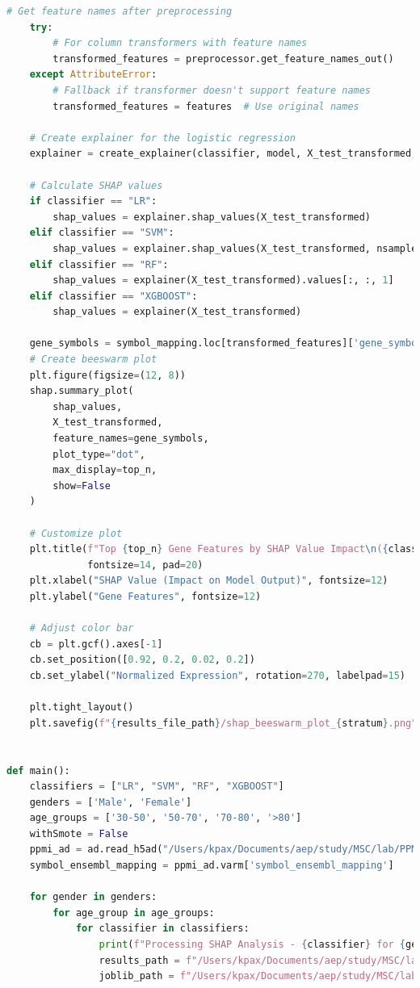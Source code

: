\documentclass[12pt]{report}
\begin{document}
\begin{lstlisting}[language=Python,caption={shap\_analysis\_stratified.py: Ανάλυση SHAP όλων των αποτελεσμάτων κατηγοριοποίησης από τους αλγορίθμους ML}, label=lst:shapanalysisstratified]
    # Get feature names after preprocessing
    try:
        # For column transformers with feature names
        transformed_features = preprocessor.get_feature_names_out()
    except AttributeError:
        # Fallback if transformer doesn't support feature names
        transformed_features = features  # Use original names

    # Create explainer for the logistic regression
    explainer = create_explainer(classifier, model, X_test_transformed, X_train_transformed)

    # Calculate SHAP values
    if classifier == "LR":
        shap_values = explainer.shap_values(X_test_transformed)
    elif classifier == "SVM":
        shap_values = explainer.shap_values(X_test_transformed, nsamples=100) # For class 1
    elif classifier == "RF":
        shap_values = explainer(X_test_transformed).values[:, :, 1]
    elif classifier == "XGBOOST":
        shap_values = explainer(X_test_transformed)

    gene_symbols = symbol_mapping.loc[transformed_features]['gene_symbol'].to_list()
    # Create beeswarm plot
    plt.figure(figsize=(12, 8))
    shap.summary_plot(
        shap_values,
        X_test_transformed,
        feature_names=gene_symbols,
        plot_type="dot",
        max_display=top_n,
        show=False
    )

    # Customize plot
    plt.title(f"Top {top_n} Gene Features by SHAP Value Impact\n({classifier} Pipeline)",
              fontsize=14, pad=20)
    plt.xlabel("SHAP Value (Impact on Model Output)", fontsize=12)
    plt.ylabel("Gene Features", fontsize=12)

    # Adjust color bar
    cb = plt.gcf().axes[-1]
    cb.set_position([0.92, 0.2, 0.02, 0.2])
    cb.set_ylabel("Normalized Expression", rotation=270, labelpad=15)

    plt.tight_layout()
    plt.savefig(f"{results_file_path}/shap_beeswarm_plot_{stratum}.png")


def main():
    classifiers = ["LR", "SVM", "RF", "XGBOOST"]
    genders = ['Male', 'Female']
    age_groups = ['30-50', '50-70', '70-80', '>80']
    withSmote = False
    ppmi_ad = ad.read_h5ad("/Users/kpax/Documents/aep/study/MSC/lab/PPMI_Project_133_RNASeq/ppmi_adata.h5ad")
    symbol_ensembl_mapping = ppmi_ad.varm['symbol_ensembl_mapping']

    for gender in genders:
        for age_group in age_groups:
            for classifier in classifiers:
                print(f"Processing SHAP Analysis - {classifier} for {gender} {age_group}")
                results_path = f"/Users/kpax/Documents/aep/study/MSC/lab/PPMI_Project_133_RNASeq/data/ml/classification/{classifier}/deg_classification/shap"
                joblib_path = f"/Users/kpax/Documents/aep/study/MSC/lab/PPMI_Project_133_RNASeq/data/ml/classification/{classifier}/deg_classification/no_smote"


\end{lstlisting}
\end{document}
